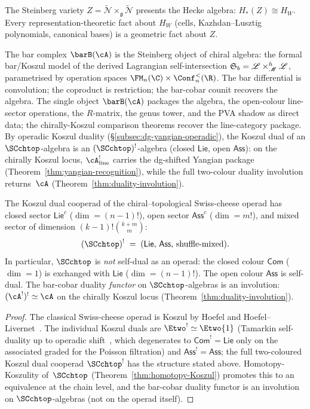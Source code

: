 The Steinberg variety $Z = \widetilde{\mathcal{N}}
\times_{\mathfrak{g}} \widetilde{\mathcal{N}}$ presents the Hecke
algebra: $H_*(Z) \cong H_W$. Every representation-theoretic fact
about $H_W$ (cells, Kazhdan--Lusztig polynomials, canonical bases)
is a geometric fact about $Z$.

The bar complex $\barB(\cA)$ is the Steinberg object of chiral
algebra: the formal bar/Koszul model of the derived Lagrangian
self-intersection $\mathfrak{S}_b = \mathscr{L} \times_{\mathscr{M}}^h
\mathscr{L}$, parametrised by operation spaces
$\FM_n(\C) \times \Conf_n^{<}(\R)$. The bar differential is
convolution; the coproduct is restriction; the bar-cobar counit
recovers the algebra. The single object $\barB(\cA)$ packages the
algebra, the open-colour line-sector operations, the $R$-matrix, the
genus tower, and the PVA shadow as direct data; the chirally-Koszul
comparison theorems recover the line-category package.
By operadic Koszul duality
(\S\ref{subsec:dg-yangian-operadic}), the Koszul dual
of an $\SCchtop$-algebra is an $(\SCchtop)^!$-algebra
(closed $\mathsf{Lie}$, open $\mathsf{Ass}$):
on the chirally Koszul locus, $\cA^!_{\mathrm{line}}$ carries the dg-shifted Yangian package
(Theorem~\ref{thm:yangian-recognition}), while the full
two-colour duality involution returns~$\cA$
(Theorem~\ref{thm:duality-involution}).

\begin{proposition}
\label{prop:sc-koszul-duality-nonselfdual}
The Koszul dual cooperad of the chiral--topological Swiss-cheese
operad has closed sector $\mathsf{Lie}^c$
\textup{(}$\dim = (n-1)!$\textup{)},
open sector $\mathsf{Ass}^c$ \textup{(}$\dim = m!$\textup{)},
and mixed sector of dimension $(k-1)!\binom{k+m}{m}$:
\[
(\SCchtop)^! \;=\; (\mathsf{Lie},\, \mathsf{Ass},\,
\text{shuffle-mixed}).
\]
In particular, $\SCchtop$ is \emph{not} self-dual as an operad:
the closed colour $\mathsf{Com}$ \textup{(}$\dim = 1$\textup{)}
is exchanged with $\mathsf{Lie}$ \textup{(}$\dim = (n-1)!$\textup{)}.
The open colour $\mathsf{Ass}$ is self-dual.
The bar-cobar duality \emph{functor} on $\SCchtop$-algebras
is an involution: $(\cA^!)^! \simeq \cA$ on the chirally Koszul
locus \textup{(}Theorem~\textup{\ref{thm:duality-involution})}.
\end{proposition}

\begin{proof}
The classical Swiss-cheese operad is Koszul
by Hoefel and Hoefel--Livernet~\cite{Hoe09,HL12}.
The individual Koszul duals are
$\Etwo^{!} \simeq \Etwo\{1\}$ (Tamarkin self-duality up to
operadic shift~\cite{Tam03}, which degenerates to
$\mathsf{Com}^! = \mathsf{Lie}$ only on the associated graded
for the Poisson filtration) and
$\mathsf{Ass}^! = \mathsf{Ass}$;
the full two-coloured Koszul dual cooperad
${\SCchtop}^{!}$ has the structure stated above.
Homotopy-Koszulity of~$\SCchtop$
(Theorem~\ref{thm:homotopy-Koszul}) promotes this to an
equivalence at the chain level, and the bar-cobar
duality functor is an involution on $\SCchtop$-algebras
(not on the operad itself).
\end{proof}

